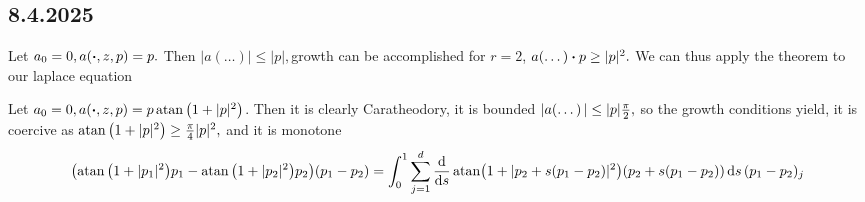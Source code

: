 \documentclass{article}
\begin{document}
\subsection{8.4.2025}
\label{sec:8.4.2025}

\begin{example}[Laplace]
    Let $a_0=0, a\qty(\vdot, z, p) = p.$ Then $|a(\dots)| \leq |p|, $growth can be accomplished for $r=2$, $a(\dots) \vdot p \geq |p|^{2}.$ We can thus apply the theorem to our laplace equation
\end{example}

\begin{example}
	Let $a_0 = 0, a\qty(\vdot, z, p) = p \atan\qty(1+|p|^{2})$. Then it is clearly Caratheodory, it is bounded $|a\qty(\dots)| \leq |p| \frac{\pi}{2},$ so the growth conditions yield, it is coercive as $ \atan\qty(1+|p|^{2})\geq \frac{\pi}{4}|p|^{2},$ and it is monotone
	\[
		\qty(\atan\qty(1+|p_1|^{2})p_1 - \atan\qty(1+|p_2|^{2})p_2)(p_1 - p_2) = \int_0^1 \sum_{j=1}^d\dv{s} \atan(1+|p_2 +s(p_1-p_2)|^{2})(p_2 + s(p_1-p_2))\dd{s} (p_1 - p_2)_j
	\]
\end{example}
\end{document}
